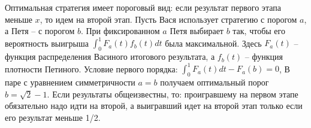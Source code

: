 \begin{solution}{5.10}

\end{solution}
\begin{solution}{5.11}

\end{solution}
\begin{solution}{5.12}

\end{solution}
\begin{solution}{5.13}

\end{solution}
\begin{solution}{5.14}

\end{solution}
\begin{solution}{5.15}

\end{solution}
\begin{solution}{5.16}

\end{solution}
\begin{solution}{5.17}

\end{solution}
\begin{solution}{5.18}

\end{solution}
\begin{solution}{5.19}

\end{solution}
\begin{solution}{5.20}
Оптимальная стратегия имеет пороговый вид: если результат первого этапа меньше $x$, то идем на второй этап. Пусть Вася использует стратегию с порогом $a$, а Петя -- с порогом $b$. При фиксированном $a$ Петя выбирает $b$ так, чтобы его вероятность выигрыша $\int_{0}^{1}F_{a}(t)f_{b}(t)dt$ была максимальной. Здесь $F_{a}(t)$ -- функция распределения Васиного итогового результата, а $f_{b}(t)$ -- функция плотности Петиного. Условие первого порядка: $\int_{0}^{1}F_{a}(t)dt-F_{a}(b)=0$,  В паре с уравнением симметричности $a=b$ получаем оптимальный порог $b=\sqrt{2}-1$. Если результаты общеизвестны, то: проигравшему на первом этапе обязательно надо идти на второй, а выигравший идет на второй этап только если его результат меньше 1/2.
\end{solution}
